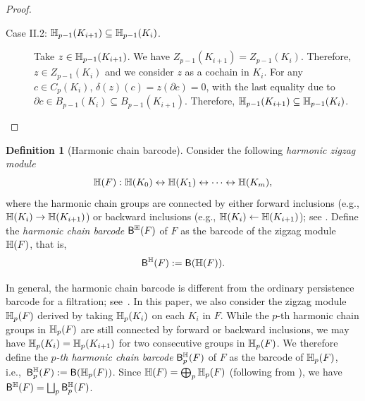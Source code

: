 \documentclass[10pt,a4paper]{amsart}
\newcommand {\mm}[1] {\ifmmode{#1}\else{\mbox{\(#1\)}}\fi}
\newcommand{\har}           {\mm{\mathbb{H}}}
\newcommand{\hcd}{{harmonic chain barcode}}
\newcommand{\hcb}{{harmonic chain barcode}}
\theoremstyle{definition}
\newcommand{\barc}{\mathsf{B}}
\newcommand{\filt}{F}
\newcommand{\filtcnt}{m}
\newcommand{\fsimp}{\sigma}
\newcommand{\hbarc}{\mathsf{B}^\har}
\newtheorem{definition}[theorem]{Definition}
\theoremstyle{remark}
\begin{document}
\begin{proof}
\begin{description}
\item[Case II.2: $\har_{p-1}(K_{i+1}) \subseteq \har_{p-1}(K_i)$.]
Take $z \in \har_{p-1}(K_{i+1})$. We have $Z_{p-1}(K_{i+1}) = Z_{p-1}(K_i)$.
Therefore, $z \in Z_{p-1}(K_i)$
and we consider $z$ as a cochain in $K_i$. 
For any $c \in C_{p}(K_{i})$,  $\delta (z) (c) = z(\partial c) = 0$, 
with the last equality due to $\partial c\in B_{p-1}(K_i) \subseteq B_{p-1}(K_{i+1})$.
Therefore, $\har_{p-1}(K_{i+1}) \subseteq \har_{p-1}(K_i)$.\qedhere
\end{description}
\end{proof}

\begin{definition}[Harmonic chain barcode]
Consider the following \emph{harmonic zigzag module}
\begin{equation}
\label{eqn:har-zz-mod}
\har(\filt): \har(K_0) \leftrightarrow \har(K_1) \leftrightarrow
\cdots \leftrightarrow \har(K_\filtcnt),
\end{equation}
where the harmonic chain groups are connected by either forward inclusions {\rm(}e.g., $\har(K_i) \to \har(K_{i+1})${\rm)} or backward inclusions {\rm(}e.g., $\har(K_i) \leftarrow \har(K_{i+1})${\rm);}
see .
Define the \emph{\hcd} $\hbarc(\filt)$ of $\filt$ 
as the barcode of the zigzag module $\har(\filt)$,
that is, \[\hbarc(\filt):=\barc(\har(\filt)).\]
\end{definition}

In general, the {\hcb} is different from the ordinary persistence barcode for a filtration; see~.
In this paper, we also consider the zigzag module $\har_p(\filt)$ derived by taking $\har_p(K_i)$ on each $K_i$ in $\filt$.
While the $p$-th harmonic chain groups in $\har_p(\filt)$ are still connected by forward or backward inclusions, we may have $\har_p(K_i)=\har_p(K_{i+1})$ for two consecutive groups in $\har_p(\filt)$.
We therefore define the \emph{$p$-th {\hcb}} $\hbarc_p(\filt)$ of $\filt$ 
as the barcode of $\har_p(\filt)$,
i.e.,~$\hbarc_p(\filt):=\barc(\har_p(\filt))$.
Since $\har(\filt)=\bigoplus_p\har_p(\filt)$ (following from ),
we have $\hbarc(\filt)=\bigsqcup_p\hbarc_p(\filt)$.
\end{document}
